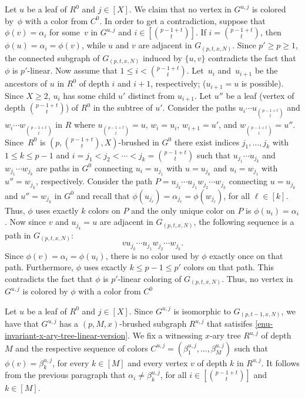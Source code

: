Let $u$ be a leaf of $R^0$ and $j\in [X]$.  We claim that no vertex in
$G^{u,j}$ is colored by~$\phi$ with a color from $C^0$. In order to get a
contradiction, suppose that $\phi(v) =\alpha_i$ for some~$v$ in $G^{u,j}$ and
$i\in\left[\binom{p-1+t}{t}\right]$.  If $i=\binom{p-1+t}{t}$, then
$\phi(u) = \alpha_i = \phi(v)$, while $u$ and $v$ are adjacent in
$G_{(p,t,x,N)}$.  Since $p'\geq p\geq1$, the connected subgraph of
$G_{(p,t,x,N)}$ induced by $\{u,v\}$ contradicts the fact that $\phi$ is
$p'$-linear.  Now assume that $1\leq i< \binom{p-1+t}{t}$.  Let~$u_i$
and~$u_{i+1}$ be the ancestors of $u$ in $R^0$ of depth $i$ and $i+1$,
respectively; ($u_{i+1} = u$ is possible).  Since $X\geq2$, $u_i$ has some
child $u'$ distinct from $u_{i+1}$.  Let $u''$ be a leaf (vertex of depth
$\binom{p-1+t}{t}$) of $R^0$ in the subtree of $u'$.  Consider the paths
$u_i \cdots u_{\binom{p-1+t}{t}}$ and $w_i \cdots w_{\binom{p-1+t}{t}}$ in
$R$ where $u_{\binom{p-1+t}{t}}=u$, $w_i=u_i$, $w_{i+1}=u'$, and
$w_{\binom{p-1+t}{t}}=u''$.  Since~$R^0$ is
$\left(p,\binom{p-1+t}{t},X\right)$-brushed in $G^0$ there exist indices
$j_1,\ldots,j_k$ with $1\leq k \leq p-1$ and
$i=j_1 < j_2 < \cdots < j_k=\binom{p-1+t}{t}$ such that
$u_{j_1}\cdots u_{j_k}$ and $w_{j_1}\cdots w_{j_k}$ are paths in $G^0$
connecting $u_i = u_{j_1}$ with $u = u_{j_k}$ and $u_i = w_{j_1}$ with
$u'' = w_{j_k}$, respectively.  Consider the path
$P = u_{j_k} \cdots u_{j_1} w_{j_2} \cdots w_{j_k}$ connecting $u=u_{j_k}$ and
$u''=w_{j_k}$ in $G^0$ and recall that
$\phi(u_{j_{\ell}}) = \alpha_{j_{\ell}} =\phi(w_{j_{\ell}})$, for all
$\ell\in[k]$.  Thus, $\phi$ uses exactly $k$ colors on $P$ and the only unique
color on $P$ is $\phi(u_i) = \alpha_i$.  Now since $v$ and $u_{j_k}=u$ are
adjacent in $G_{(p,t,x,N)}$, the following sequence is a path in
$G_{(p,t,x,N)}$:
\[
v u_{j_k} \cdots u_{j_1} w_{j_2} \cdots w_{j_k}.
\]
Since $\phi(v) =\alpha_i = \phi(u_i)$, there is no color used by $\phi$ exactly once on that path. 
Furthermore, $\phi$ uses exactly $k \leq p-1 \leq p'$ colors on that path. 
This contradicts the fact that $\phi$ is $p'$-linear coloring of $G_{(p,t,x,N)}$.
Thus, no vertex in $G^{u,j}$ is colored by $\phi$ with a color from $C^0$

Let $u$ be a leaf of $R^0$ and $j\in [X]$. 
Since $G^{u,j}$ is isomorphic to $G_{(p,t-1,x,N)}$, we have that
$G^{u,j}$ has a $\left(p,M,x\right)$-brushed subgraph $R^{u,j}$ that satisifes \eqref{enu-invariant-x-ary-tree-linear-version}.
We fix a witnessing $x$-ary tree $R^{u,j}$ of depth $M$ and the respective sequence of colors $C^{u,j}=\left(\beta^{u,j}_1,\ldots,\beta^{u,j}_{M}\right)$ such that $\phi(v)=\beta^{u,j}_k$, 
for every $k\in\left[M\right]$ and every vertex $v$ of depth $k$ in $R^{u,j}$.
It follows from the previous paragraph that $\alpha_i \neq \beta^{u,j}_k$, for all $i\in\left[\binom{p-1+t}{t}\right]$ and $k\in\left[M\right]$.

